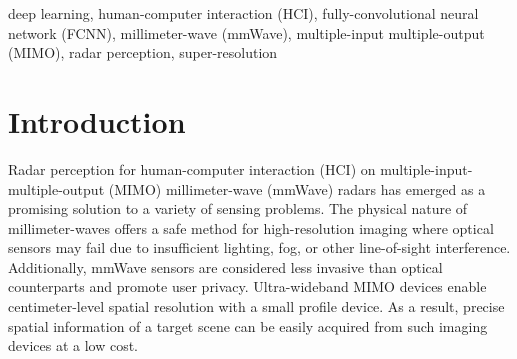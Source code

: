 \documentclass[10pt,journal,final]{IEEEtran}
\begin{document}
\begin{abstract}
In this article, we propose a framework for contactless human-computer interaction (HCI) using novel tracking techniques based on deep learning-based super-resolution and tracking algorithms. 
Our system offers unprecedented high-resolution tracking of hand position and motion characteristics by leveraging spatial and temporal features embedded in the reflected radar waveform. 
Rather than classifying samples from a predefined set of hand gestures, as common in existing work on deep learning with mmWave radar, our proposed imager employs a regressive full convolutional neural network (FCNN) approach to improve localization accuracy by spatial super-resolution. 
While the proposed techniques are suitable for a host of tracking applications, this article focuses on their application as a musical interface to demonstrate the robustness of the gesture sensing pipeline and deep learning signal processing chain. 
The user can control the instrument by varying the position and velocity of their hand above the vertically-facing sensor.
By employing a commercially available multiple-input-multiple-output (MIMO) radar rather than a traditional optical sensor, our framework demonstrates the efficacy of the mmWave sensing modality for fine motion tracking and offers an elegant solution to a host of HCI tasks.
Additionally, we provide a freely available software package and user interface for controlling the device, streaming the data to MATLAB in real-time, and increasing accessibility to the signal processing and device interface functionality utilized in this article. 
\end {abstract}

\begin{IEEEkeywords}
	deep learning, human-computer interaction (HCI), fully-convolutional neural network (FCNN), millimeter-wave (mmWave), multiple-input multiple-output (MIMO), radar perception, super-resolution
\end{IEEEkeywords}


\section{Introduction}
\label{sec:introduction}
Radar perception for human-computer interaction (HCI) on multiple-input-multiple-output (MIMO) millimeter-wave (mmWave) radars has emerged as a promising solution to a variety of sensing problems. 
The physical nature of millimeter-waves offers a safe method for high-resolution imaging where optical sensors may fail due to insufficient lighting, fog, or other line-of-sight interference. 
Additionally, mmWave sensors are considered less invasive than optical counterparts and promote user privacy.
Ultra-wideband MIMO devices enable centimeter-level spatial resolution with a small profile device.
As a result, precise spatial information of a target scene can be easily acquired from such imaging devices at a low cost.
\end{document}
